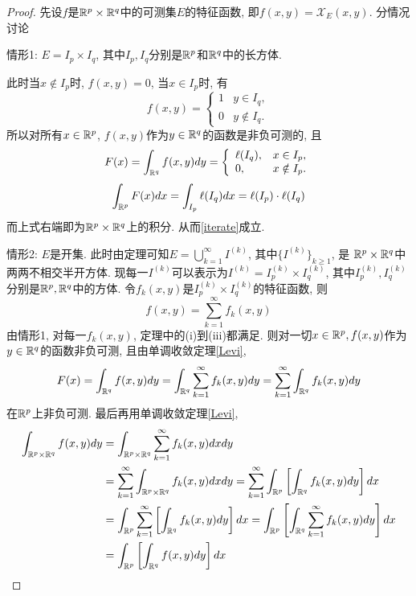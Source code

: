 \documentclass[12pt, a4paper, oneside, UTF8]{ctexbook}  %
\begin{document}
\begin{proof}
    先设$f$是$\mathbb{R}^p\times\mathbb{R}^q$中的可测集$E$的特征函数, 即$f(x, y) = \mathcal{X}_E(x, y)$. 分情况讨论
    \par 情形1: $E = I_p \times I_q$, 其中$I_p, I_q$分别是$\mathbb{R}^p$和$\mathbb{R}^q$中的长方体.
    \par 此时当$x\notin I_p$时, $f(x, y)=0$, 当$x\in I_p$时, 有
    $$ f(x, y) = \left\{\begin{array}{ll}1 & y\in I_q, \\ 0 & y\notin I_q.\end{array}\right. $$
    所以对所有$x\in\mathbb{R}^p$, $f(x, y)$作为$y\in\mathbb{R}^q$的函数是非负可测的, 且
    $$ F(x) = \int_{\mathbb{R}^q}f(x, y)dy = \left\{ \begin{array}{ll}\ell(I_q), & x\in I_p, \\0, & x\notin I_p. \end{array}\right. $$
    $$ \int_{\mathbb{R}^p}F(x)dx = \int_{I_p}\ell(I_q)dx = \ell(I_p)\cdot\ell(I_q) $$
    而上式右端即为$\mathbb{R}^p\times\mathbb{R}^q$上的积分. 从而\ref{iterate}成立.
    \vspace{1cm}
    \par 情形2: $E$是开集. 此时由定理可知$E = \bigcup_{k=1}^\infty I^{(k)}$, 其中$\{ I^{(k)} \}_{k\geq1}$, 是
    $\mathbb{R}^p\times\mathbb{R}^q$中两两不相交半开方体. 现每一$I^{(k)}$可以表示为$I^{(k)} = I^{(k)}_p \times I^{(k)}_q$, 
    其中$I^{(k)}_p, I^{(k)}_q$分别是$\mathbb{R}^p, \mathbb{R}^q$中的方体. 令$f_k(x, y)$是$I^{(k)}_p \times I^{(k)}_q$的特征函数, 
    则$$ f(x, y) = \sum_{k=1}^\infty f_k(x, y) $$
    由情形1, 对每一$f_k(x, y)$, 定理中的(i)到(iii)都满足. 则对一切$x\in \mathbb{R}^p, f(x, y)$作为$y\in\mathbb{R}^q$的函数非负可测, 
    且由单调收敛定理\ref{Levi}, 
    $$ F(x) = \int_{\mathbb{R}^q}f(x, y)dy = \int_{\mathbb{R}^q}\sum_{k=1}^\infty f_k(x, y)dy = \sum_{k=1}^\infty\int_{\mathbb{R}^q}f_k(x, y)dy $$
    在$\mathbb{R}^p$上非负可测. 最后再用单调收敛定理\ref{Levi}, 
    \begin{align*}
        \int_{\R^p\times\R^q}f(x, y)dy& = \int_{\R^p\times\R^q}\sum_{k=1}^\infty f_k(x, y)dxdy \\
                                      & = \sum_{k=1}^\infty \int_{\R^p\times\R^q}f_k(x, y)dxdy = 
                                      \sum_{k=1}^\infty\int_{\R^p}\left[ \int_{\R^q} f_k(x, y)dy \right]dx \\
                                      & = \int_{\R^p}\sum_{k=1}^\infty\left[ \int_{\R^q} f_k(x, y)dy \right]dx = 
                                      \int_{\R^p}\left[ \int_{\R^q} \sum_{k=1}^\infty f_k(x, y)dy \right]dx \\
                                      & = \int_{\R^p}\left[ \int_{\R^q} f(x, y)dy \right]dx

\end{align*}
\end{proof}
\end{document}
